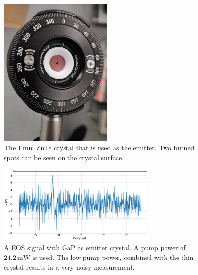 \begin{figure}
    \centering
    \includegraphics[width=0.5\textwidth]{Plots/burned_crystal.jpeg}
    \caption{The $\SI{1}{\milli\meter}$ ZnTe crystal that is used as the emitter.
    Two burned spots can be seen on the crystal surface.}
    \label{fig:ZnTe_burned}
\end{figure}

\begin{figure}
    \centering
    \includegraphics[width=0.7\textwidth]{Plots/GaP14_20_20normalX.pdf}
    \caption{A EOS signal with GaP as emitter crystal. A pump power of $\SI{24.2}{\milli\W}$ is used.
    The low pump power, combined with the thin crystal results in a very noisy measurement.}
    \label{fig:GaP_noise}
\end{figure}
